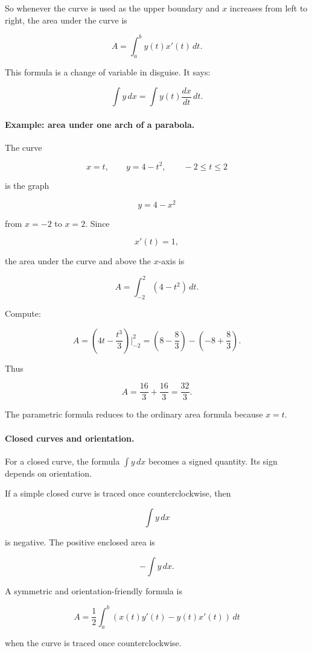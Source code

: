 So whenever the curve is used as the upper boundary and \(x\) increases from left to
right, the area under the curve is

\[
\boxed{
A=\int_a^b y(t)x'(t)\,dt.
}
\]

This formula is a change of variable in disguise.  It says:

\[
\int y\,dx
=
\int y(t)\frac{dx}{dt}\,dt.
\]

\paragraph{Example: area under one arch of a parabola.}
The curve

\[
x=t,
\qquad
y=4-t^2,
\qquad
-2\le t\le 2
\]

is the graph

\[
y=4-x^2
\]

from \(x=-2\) to \(x=2\).  Since

\[
x'(t)=1,
\]

the area under the curve and above the \(x\)-axis is

\[
A=\int_{-2}^{2} (4-t^2)\,dt.
\]

Compute:

\[
A=
\left(4t-\frac{t^3}{3}\right)\Big|_{-2}^{2}
=
\left(8-\frac83\right)-\left(-8+\frac83\right).
\]

Thus

\[
A=\frac{16}{3}+\frac{16}{3}
=
\boxed{\frac{32}{3}}.
\]

The parametric formula reduces to the ordinary area formula because \(x=t\).

\paragraph{Closed curves and orientation.}
For a closed curve, the formula \(\int y\,dx\) becomes a signed quantity.  Its sign depends
on orientation.

If a simple closed curve is traced once counterclockwise, then

\[
\int y\,dx
\]

is negative.  The positive enclosed area is

\[
-\int y\,dx.
\]

A symmetric and orientation-friendly formula is

\[
\boxed{
A=
\frac12\int_a^b
\left(
x(t)y'(t)-y(t)x'(t)
\right)\,dt
}
\]

when the curve is traced once counterclockwise.

